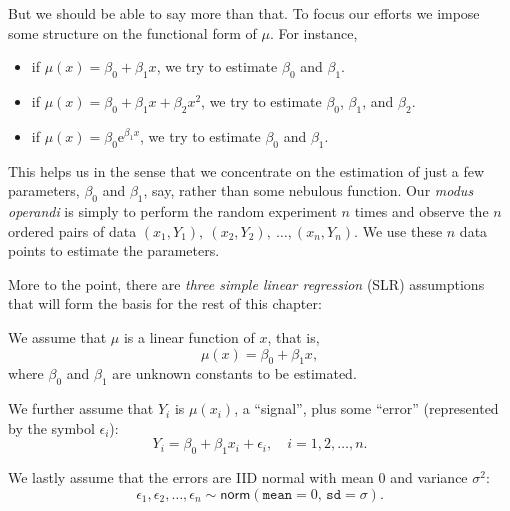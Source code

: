 \documentclass[captions=tableheading]{scrbook}
\begin{document}
But we should be able to say more than that. To focus our efforts we impose some structure on the functional form of \(\mu\). For instance, 
\begin{itemize}
\item if \(\mu(x)=\beta_{0}+\beta_{1}x\), we try to estimate \( \beta_{0} \) and \( \beta_{1} \).
\item if \( \mu(x) = \beta_{0} + \beta_{1}x + \beta_{2}x^{2} \), we try to estimate \(\beta_{0}\), \(\beta_{1}\), and \(\beta_{2}\).
\item if \( \mu(x) = \beta_{0} \mathrm{e}^{\beta_{1}x} \), we try to estimate \(\beta_{0}\) and \(\beta_{1}\).
\end{itemize}

This helps us in the sense that we concentrate on the estimation of just a few parameters, \(\beta_{0}\) and \(\beta_{1}\), say, rather than some nebulous function. Our \emph{modus operandi} is simply to perform the random experiment \(n\) times and observe the \(n\) ordered pairs of data \( (x_{1},Y_{1}),\ (x_{2},Y_{2}),\ \ldots,(x_{n},Y_{n}) \). We use these \(n\) data points to estimate the parameters.

More to the point, there are \emph{three simple linear regression} (SLR) assumptions that will form the basis for the rest of this chapter:

\begin{assumption}
We assume that \(\mu\) is a linear function of \(x\), that is, 
\begin{equation}
\mu(x)=\beta_{0}+\beta_{1}x,
\end{equation}
where \(\beta_{0}\) and \(\beta_{1}\) are unknown constants to be estimated.
\end{assumption}

\begin{assumption}
We further assume that \( Y_{i} \) is \( \mu(x_{i}) \), a ``signal'', plus some ``error'' (represented by the symbol \( \epsilon_{i} \)):
\begin{equation}
Y_{i} = \beta_{0} + \beta_{1}x_{i} + \epsilon_{i}, \quad i = 1,2,\ldots,n.
\end{equation}
\end{assumption}

\begin{assumption}
We lastly assume that the errors are IID normal with mean 0 and variance \( \sigma^{2} \):
\begin{equation}
\epsilon_{1},\epsilon_{2},\ldots,\epsilon_{n}\sim\mathsf{norm}(\mathtt{mean}=0,\,\mathtt{sd}=\sigma).
\end{equation}
\end{assumption}
\end{document}

